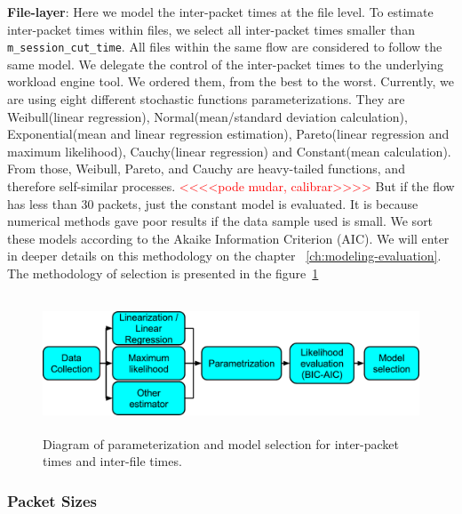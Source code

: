 \textbf{File-layer}: Here we model the inter-packet times at the file level. To estimate inter-packet times within files, we select all inter-packet times smaller than \texttt{m\_session\_cut\_time}. All files within the same flow are considered to follow the same model. We delegate the control of the inter-packet times to the underlying workload engine tool. We ordered them, from the best to the worst. Currently, we are using eight different stochastic functions parameterizations. They are Weibull(linear regression), Normal(mean/standard deviation calculation), Exponential(mean and linear regression estimation), Pareto(linear regression and maximum likelihood), Cauchy(linear regression) and Constant(mean calculation). From those, Weibull, Pareto, and Cauchy are heavy-tailed functions, and therefore self-similar processes. \textcolor{red}{<<<<pode mudar, calibrar>>>>} But if the flow has less than 30 packets, just the constant model is evaluated. It is because numerical methods gave poor results if the data sample used is small. We sort these models according to the Akaike Information Criterion (AIC)\cite{sourcesonoff-paper}\cite{bic-aic-comparision}. We will enter in deeper details on this methodology on the chapter ~\ref{ch:modeling-evaluation}. The methodology of selection is presented in the figure~\ref{fig:model-parameterization}

\begin{figure}[ht!]
    \centering
    \includegraphics[height=1.6in]{figures/ch3/ipt-modeling}
    \caption{Diagram of parameterization and model selection for inter-packet times and inter-file times.}
    \label{fig:model-parameterization}
\end{figure}


\subsubsection{Packet Sizes}

